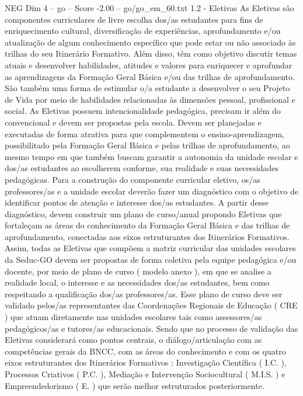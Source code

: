 \begin{textsample}{NEG Dim 4 – go – Score -2.00 – go/go\_em\_60.txt}  \label{ex:f4_neg_225}
1.2 - Eletivas As Eletivas são componentes curriculares de livre escolha dos/as estudantes para fins de enriquecimento cultural, diversificação de experiências, aprofundamento e/ou atualização de algum conhecimento específico que pode estar ou não associado às trilhas do seu Itinerário Formativo.
Além disso, têm como objetivo discutir temas atuais e desenvolver habilidades, atitudes e valores para enriquecer e aprofundar as aprendizagens da Formação Geral Básica e/ou das trilhas de aprofundamento.
São também uma forma de estimular o/a estudante a desenvolver o seu Projeto de Vida por meio de habilidades relacionadas às dimensões pessoal, profissional e social.
As Eletivas possuem intencionalidade pedagógica, precisam ir além do convencional e devem ser propostas pela escola.
Devem ser planejadas e executadas de forma atrativa para que complementem o ensino-aprendizagem, possibilitado pela Formação Geral Básica e pelas trilhas de aprofundamento, ao mesmo tempo em que também buscam garantir a autonomia da unidade escolar e dos/as estudantes ao escolherem conforme, sua realidade e suas necessidades pedagógicas.
Para a construção do componente curricular eletivo, os/as professores/as e a unidade escolar deverão fazer um diagnóstico com o objetivo de identificar pontos de atenção e interesse dos/as estudantes.
A partir desse diagnóstico, devem construir um plano de curso/anual propondo Eletivas que fortaleçam as áreas do conhecimento da Formação Geral Básica e das trilhas de aprofundamento, conectadas aos eixos estruturantes dos Itinerários Formativos.
Assim, todas as Eletivas que compõem a matriz curricular das unidades escolares da Seduc-GO devem ser propostas de forma coletiva pela equipe pedagógica e/ou docente, por meio de plano de curso ( modelo anexo ), em que se analise a realidade local, o interesse e as necessidades dos/as estudantes, bem como respeitando a qualificação dos/as professores/as.
Esse plano de curso deve ser validado pelos/as representantes das Coordenações Regionais de Educação ( CRE ) que atuam diretamente nas unidades escolares tais como assessores/as pedagógicos/as e tutores/as educacionais.
Sendo que no processo de validação das Eletivas considerará como pontos centrais, o diálogo/articulação com as competências gerais da BNCC, com as áreas do conhecimento e com os quatro eixos estruturantes dos Itinerários Formativos : Investigação Científica ( I.C. ), Processos Criativos ( P.C. ), Mediação e Intervenção Sociocultural ( M.I.S. ) e Empreendedorismo ( E. ) que serão melhor estruturados posteriormente.

\end{textsample}
